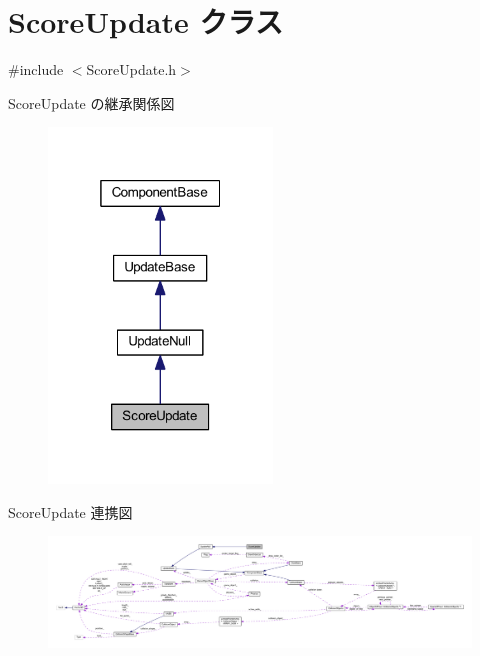 \hypertarget{class_score_update}{}\section{Score\+Update クラス}
\label{class_score_update}


{\ttfamily \#include $<$Score\+Update.\+h$>$}



Score\+Update の継承関係図\nopagebreak
\begin{figure}[H]
\begin{center}
\leavevmode
\includegraphics[width=169pt]{class_score_update__inherit__graph}
\end{center}
\end{figure}


Score\+Update 連携図\nopagebreak
\begin{figure}[H]
\begin{center}
\leavevmode
\includegraphics[width=350pt]{class_score_update__coll__graph}
\end{center}
\end{figure}
